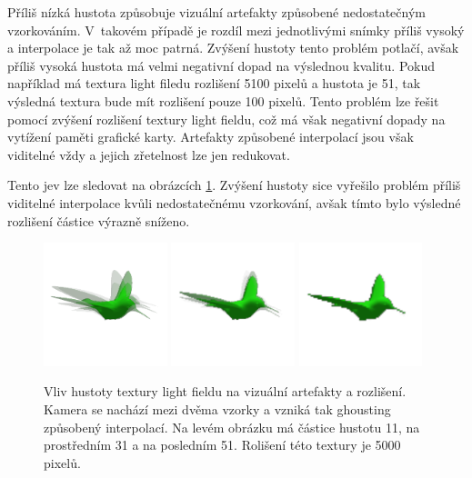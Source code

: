 Příliš nízká hustota způsobuje vizuální artefakty způsobené nedostatečným vzorkováním. V~takovém případě je rozdíl mezi jednotlivými snímky příliš vysoký a interpolace je tak až moc patrná. Zvýšení hustoty tento problém potlačí, avšak příliš vysoká hustota má velmi negativní dopad na výslednou kvalitu. Pokud například má textura light filedu rozlišení 5100 pixelů a hustota je 51, tak výsledná textura bude mít rozlišení pouze 100 pixelů. Tento problém lze řešit pomocí zvýšení rozlišení textury light fieldu, což má však negativní dopady na vytížení paměti grafické karty. Artefakty způsobené interpolací jsou však viditelné vždy a jejich zřetelnost lze jen redukovat. 

Tento jev lze sledovat na obrázcích \ref{fig:density_visual}. Zvýšení hustoty sice vyřešilo problém příliš viditelné interpolace kvůli nedostatečnému vzorkování, avšak tímto bylo výsledné rozlišení částice výrazně sníženo.  

\begin{figure}[H]
	\centering
	\includegraphics[width=0.32\textwidth]{obrazky-figures/density_l1.png}
	\includegraphics[width=0.32\textwidth]{obrazky-figures/density_l2.png}
	\includegraphics[width=0.32\textwidth]{obrazky-figures/density_l3.png}

	\caption{Vliv hustoty textury light fieldu na vizuální artefakty a rozlišení. Kamera se nachází mezi dvěma vzorky a vzniká tak ghousting způsobený interpolací. Na levém obrázku má částice hustotu 11, na prostředním 31 a na posledním 51. Rolišení této textury je 5000 pixelů.}
	\label{fig:density_visual}
\end{figure}


